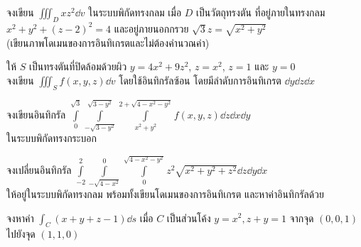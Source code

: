 \documentclass[12pt,final]{novelette} %
\begin{document}
\begin{question}
    \item {}
    \begin{question}
        \item
        จงเขียน $\iiint_D xz^2 \dd{v}$ ในระบบพิกัดทรงกลม เมื่อ $D$ เป็นวัตถุทรงตัน ที่อยู่ภายในทรงกลม \\
        $x^2 + y^2 + (z-2)^2 = 4$
        และอยู่ภายนอกกรวย $\sqrt3 z = \sqrt{x^2 + y^2}$ \\
        (เขียนภาพโดเมนของการอินทิเกรตและไม่ต้องคำนวณค่า) 



        \item
        ให้ $S$ เป็นทรงตันที่ปิดล้อมด้วยผิว $y = 4x^2 + 9z^2$, $z = x^2$, $z = 1$ และ $y = 0$ \\
        จงเขียน $\iiint_S f(x, y, z) \dd{v}$ โดยใช้อินทิกรัลซ้อน โดยมีลำดับการอินทิเกรต $\dd{y} \dd{z} \dd{x}$ 



        \item
        จงเขียนอินทิกรัล \quad $\displaystyle \int\limits_0^{\sqrt3} \int\limits_{-\sqrt{3-y^2}}^{\sqrt{3-y^2}} \int\limits_{x^2+y^2}^{2+\sqrt{4-x^2-y^2}} f(x, y, z) \dd{z}\dd{x}\dd{y}$ \\[.5em]
        ในระบบพิกัดทรงกระบอก 


    \end{question}

    \item {}
    จงเปลี่ยนอินทิกรัล $\displaystyle \int\limits_{-2}^2 \int\limits_{-\sqrt{4-x^2}}^0 \int\limits_0^{\sqrt{4-x^2-y^2}} z^2 \sqrt{x^2 + y^2 + z^2} \dd{z} \dd{y} \dd{x}$ \\[.5em]
    ให้อยู่ในระบบพิกัดทรงกลม พร้อมทั้งเขียนโดเมนของการอินทิเกรต และหาค่าอินทิกรัลด้วย 



    \item {}
    \begin{question}
        \item
        จงหาค่า $\int_C (x + y + z - 1) \dd{s}$ เมื่อ $C$ เป็นส่วนโค้ง $y = x^2, z + y = 1$ จากจุด $(0,0,1)$ ไปยังจุด $(1,1,0)$ 


\end{question}
\end{question}
\end{document}
